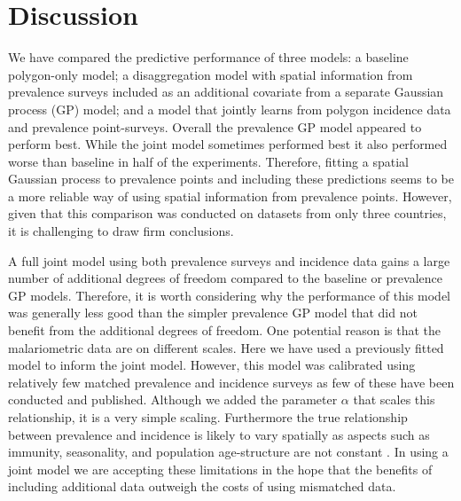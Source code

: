 \documentclass{statsoc}
\begin{document}
\section*{Discussion}



We have compared the predictive performance of three models: a baseline polygon-only model; a disaggregation model with spatial information from prevalence surveys included as an additional covariate from a separate Gaussian process (GP) model; and a model that jointly learns from polygon incidence data and prevalence point-surveys.
Overall the prevalence GP model appeared to perform best.
While the joint model sometimes performed best it also performed worse than baseline in half of the experiments.
Therefore, fitting a spatial Gaussian process to prevalence points and including these predictions seems to be a more reliable way of using spatial information from prevalence points.
However, given that this comparison was conducted on datasets from only three countries, it is challenging to draw firm conclusions.


A full joint model using both prevalence surveys and incidence data gains a large number of additional degrees of freedom compared to the baseline or prevalence GP models.
Therefore, it is worth considering why the performance of this model was generally less good than the simpler prevalence GP model that did not benefit from the additional degrees of freedom.
One potential reason is that the malariometric data are on different scales.
Here we have used a previously fitted model \citep{cameron2015defining} to inform the joint model.
However, this model was calibrated using relatively few matched prevalence and incidence surveys as few of these have been conducted and published.
Although we added the parameter $\alpha$ that scales this relationship, it is a very simple scaling.
Furthermore the true relationship between prevalence and incidence is likely to vary spatially as aspects such as immunity, seasonality, and population age-structure are not constant \citep{cameron2015defining, battle2015defining, reiner2015seasonality}.
In using a joint model we are accepting these limitations in the hope that the benefits of including additional data outweigh the costs of using mismatched data.
\end{document}
